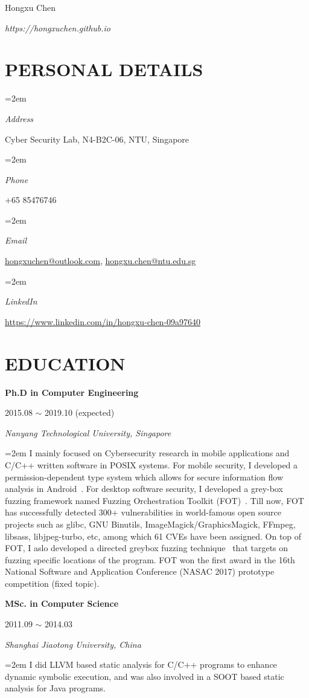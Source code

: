 \documentclass[paper=a4,fontsize=11pt]{article} %
\newlength{\spacebox}
\newcommand{\sepspace}{\vspace*{9pt}}		%
\newcommand{\MyName}[2]{ %
		\Huge \usefont{OT1}{phv}{b}{n} \hfill #1 #2
		\par \normalsize \normalfont}
\newcommand{\MySlogan}[1]{ %
		\large \usefont{OT1}{phv}{m}{n}\hfill \textit{#1}
		\par \normalsize \normalfont}
\newcommand{\NewPart}[1]{\section*{\uppercase{#1}}}
\newcommand{\PersonalEntry}[2]{
		\noindent\hangindent=2em\hangafter=0 %
		\parbox{\spacebox}{        %
		\textit{#1}}		       %
		\hspace{1.5em} #2 \par}    %
\newcommand{\EducationEntry}[4]{
		\noindent \textbf{#1} \hfill      %
			\parbox{16em}{%
			\hfill\color{Black}#2} \par  %
		\noindent \textit{#3} \par        %
        \noindent\hangindent=2em\hangafter=0\small #4 %
		\normalsize \par}
\begin{document}
\nocite{*}


\MyName{Hongxu Chen}{}
\MySlogan{{https://hongxuchen.github.io}}


\sepspace

\NewPart{Personal details}{}

\PersonalEntry{Address}{Cyber Security Lab, N4-B2C-06, NTU, Singapore}
\PersonalEntry{Phone}{+65 85476746}
\PersonalEntry{Email}{\url{hongxuchen@outlook.com}, \url{hongxu.chen@ntu.edu.sg}}
\PersonalEntry{LinkedIn}{\url{https://www.linkedin.com/in/hongxu-chen-09a97640}}

\NewPart{Education}{}

\EducationEntry{Ph.D in Computer Engineering}{2015.08 $\sim$ 2019.10 (expected)}{Nanyang Technological University, Singapore}{
    I mainly focused on Cybersecurity research in mobile applications and C/C++ written software in POSIX systems. For mobile security, I developed a permission-dependent type system which allows for secure information flow analysis in Android~\cite{sta}. For desktop software security, I developed a grey-box fuzzing framework named Fuzzing Orchestration Toolkit (FOT)~\cite{fse18-fot}. Till now, FOT has successfully detected 300+ vulnerabilities in world-famous open source projects such as glibc, GNU Binutils, ImageMagick/GraphicsMagick, FFmpeg, libsass, libjpeg-turbo, etc, among which 61 CVEs have been assigned. On top of FOT, I aslo developed a directed greybox fuzzing technique~\cite{hawkeye} that targets on fuzzing specific locations of the program. FOT won the first award in the 16th National Software and Application Conference (NASAC 2017) prototype competition (fixed topic).
}
\sepspace

\EducationEntry{MSc. in Computer Science}{2011.09 $\sim$ 2014.03}{Shanghai Jiaotong University, China}{
  I did LLVM based static analysis for C/C++ programs to enhance dynamic symbolic execution, and was also involved in a SOOT based static analysis for Java programs.}
\sepspace
\end{document}
